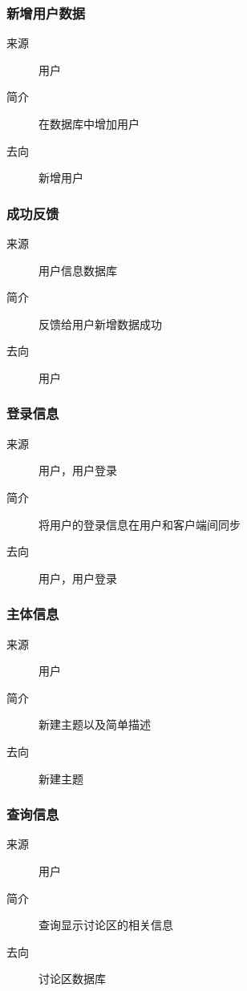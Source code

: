 \subsubsection{新增用户数据}
\begin{description}
  \item[来源]用户
\item[简介]在数据库中增加用户
\item[去向]新增用户
\end{description}

\subsubsection{成功反馈}
\begin{description}
  \item[来源]用户信息数据库
\item[简介]反馈给用户新增数据成功
\item[去向]用户
\end{description}

\subsubsection{登录信息}
\begin{description}
  \item[来源]用户，用户登录
\item[简介]将用户的登录信息在用户和客户端间同步
\item[去向]用户，用户登录
\end{description}

\subsubsection{主体信息}
\begin{description}
  \item[来源] 用户
  \item[简介] 新建主题以及简单描述
  \item[去向] 新建主题
\end{description}

\subsubsection{查询信息}
\begin{description}
  \item[来源] 用户
  \item[简介] 查询显示讨论区的相关信息
  \item[去向] 讨论区数据库
\end{description}

